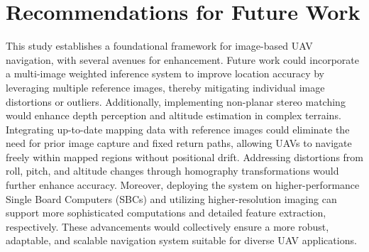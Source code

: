 \section{Recommendations for Future Work}

This study establishes a foundational framework for image-based UAV navigation, with several avenues for enhancement. Future work could incorporate a multi-image weighted inference system to improve location accuracy by leveraging multiple reference images, thereby mitigating individual image distortions or outliers. Additionally, implementing non-planar stereo matching would enhance depth perception and altitude estimation in complex terrains. Integrating up-to-date mapping data with reference images could eliminate the need for prior image capture and fixed return paths, allowing UAVs to navigate freely within mapped regions without positional drift. Addressing distortions from roll, pitch, and altitude changes through homography transformations would further enhance accuracy. Moreover, deploying the system on higher-performance Single Board Computers (SBCs) and utilizing higher-resolution imaging can support more sophisticated computations and detailed feature extraction, respectively. These advancements would collectively ensure a more robust, adaptable, and scalable navigation system suitable for diverse UAV applications.


